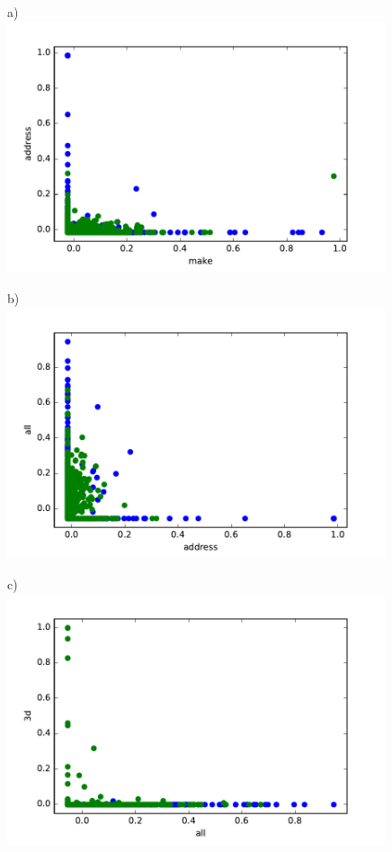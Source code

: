 \documentclass[11pt, paper=a4]{article}
\begin{document}
\begin{figure}[h]
  \begin{minipage}{0.3\textwidth}
    a)\\
    \includegraphics[width = 0.99\textwidth]{../../src/img/make_address.pdf}
  \end{minipage} \hfill
  \begin{minipage}{0.3\textwidth}
    b)\\
    \includegraphics[width = 0.99\textwidth]{../../src/img/address_all.pdf}
  \end{minipage} \hfill
  \begin{minipage}{0.3\textwidth}
    c)\\
    \includegraphics[width = 0.99\textwidth]{../../src/img/all_3d.pdf}

\end{minipage}
\end{figure}
\end{document}
